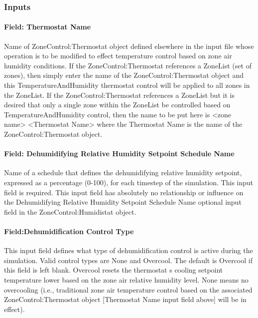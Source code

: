 \subsubsection{Inputs}\label{inputs-6-031}

\paragraph{Field: Thermostat Name}\label{field-thermostat-name-1}

Name of ZoneControl:Thermostat object defined elsewhere in the input file whose operation is to be modified to effect temperature control based on zone air humidity conditions. If the ZoneControl:Thermostat references a ZoneList (set of zones), then simply enter the name of the ZoneControl:Thermostat object and this TemperatureAndHumidity thermostat control will be applied to all zones in the ZoneList. If the ZoneControl:Thermostat references a ZoneList but it is desired that only a single zone within the ZoneList be controlled based on TemperatureAndHumidity control, then the name to be put here is \textless{}zone name\textgreater{} \textless{}Thermostat Name\textgreater{} where the Thermostat Name is the name of the ZoneControl:Thermostat object.

\paragraph{Field: Dehumidifying Relative Humidity Setpoint Schedule Name}\label{field-dehumidifying-relative-humidity-setpoint-schedule-name}

Name of a schedule that defines the dehumidifying relative humidity setpoint, expressed as a percentage (0-100), for each timestep of the simulation. This input field is required. This input field has absolutely no relationship or influence on the Dehumidifying Relative Humidity Setpoint Schedule Name optional input field in the ZoneControl:Humidistat object.

\paragraph{Field:Dehumidification Control Type}\label{fielddehumidification-control-type}

This input field defines what type of dehumidification control is active during the simulation. Valid control types are None and Overcool. The default is Overcool if this field is left blank. Overcool resets the thermostat s cooling setpoint temperature lower based on the zone air relative humidity level. None means no overcooling (i.e., traditional zone air temperature control based on the associated ZoneControl:Thermostat object {[}Thermostat Name input field above{]} will be in effect).

